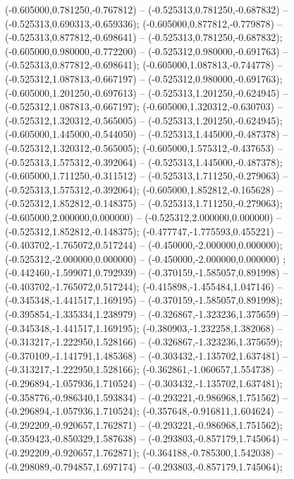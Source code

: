  (-0.605000,0.781250,-0.767812) -- (-0.525313,0.781250,-0.687832) -- (-0.525313,0.690313,-0.659336);
 (-0.605000,0.877812,-0.779878) -- (-0.525313,0.877812,-0.698641) -- (-0.525313,0.781250,-0.687832);
 (-0.605000,0.980000,-0.772200) -- (-0.525312,0.980000,-0.691763) -- (-0.525313,0.877812,-0.698641);
 (-0.605000,1.087813,-0.744778) -- (-0.525312,1.087813,-0.667197) -- (-0.525312,0.980000,-0.691763);
 (-0.605000,1.201250,-0.697613) -- (-0.525313,1.201250,-0.624945) -- (-0.525312,1.087813,-0.667197);
 (-0.605000,1.320312,-0.630703) -- (-0.525312,1.320312,-0.565005) -- (-0.525313,1.201250,-0.624945);
 (-0.605000,1.445000,-0.544050) -- (-0.525313,1.445000,-0.487378) -- (-0.525312,1.320312,-0.565005);
 (-0.605000,1.575312,-0.437653) -- (-0.525313,1.575312,-0.392064) -- (-0.525313,1.445000,-0.487378);
 (-0.605000,1.711250,-0.311512) -- (-0.525313,1.711250,-0.279063) -- (-0.525313,1.575312,-0.392064);
 (-0.605000,1.852812,-0.165628) -- (-0.525312,1.852812,-0.148375) -- (-0.525313,1.711250,-0.279063);
 (-0.605000,2.000000,0.000000) -- (-0.525312,2.000000,0.000000) -- (-0.525312,1.852812,-0.148375);
 (-0.477747,-1.775593,0.455221) -- (-0.403702,-1.765072,0.517244) -- (-0.450000,-2.000000,0.000000);
 (-0.525312,-2.000000,0.000000) -- (-0.450000,-2.000000,0.000000) ;
 (-0.442460,-1.599071,0.792939) -- (-0.370159,-1.585057,0.891998) -- (-0.403702,-1.765072,0.517244);
 (-0.415898,-1.455484,1.047146) -- (-0.345348,-1.441517,1.169195) -- (-0.370159,-1.585057,0.891998);
 (-0.395854,-1.335334,1.238979) -- (-0.326867,-1.323236,1.375659) -- (-0.345348,-1.441517,1.169195);
 (-0.380903,-1.232258,1.382068) -- (-0.313217,-1.222950,1.528166) -- (-0.326867,-1.323236,1.375659);
 (-0.370109,-1.141791,1.485368) -- (-0.303432,-1.135702,1.637481) -- (-0.313217,-1.222950,1.528166);
 (-0.362861,-1.060657,1.554738) -- (-0.296894,-1.057936,1.710524) -- (-0.303432,-1.135702,1.637481);
 (-0.358776,-0.986340,1.593834) -- (-0.293221,-0.986968,1.751562) -- (-0.296894,-1.057936,1.710524);
 (-0.357648,-0.916811,1.604624) -- (-0.292209,-0.920657,1.762871) -- (-0.293221,-0.986968,1.751562);
 (-0.359423,-0.850329,1.587638) -- (-0.293803,-0.857179,1.745064) -- (-0.292209,-0.920657,1.762871);
 (-0.364188,-0.785300,1.542038) -- (-0.298089,-0.794857,1.697174) -- (-0.293803,-0.857179,1.745064);
